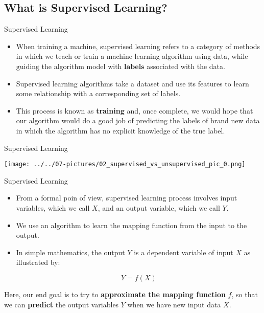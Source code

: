 \documentclass[11pt]{beamer}
\newcommand{\highlight}[1]{%
  \colorbox{yellow!100}{$\displaystyle#1$}}
\begin{document}
\subsection{What is Supervised Learning?}
\begin{frame}{Supervised Learning}
\begin{itemize}
\item When training a machine, supervised learning refers to a category of methods in which we teach or train a machine learning algorithm using data, while \highlight{\text{guiding}} the algorithm model with \highlight{\textbf{labels}} associated with the data. 
\item Supervised learning algorithms take a dataset and use its features to learn some relationship with a corresponding set of labels. 

\item This process is known as \textbf{training} and, once complete, we would hope that our algorithm would do a good job of predicting the labels of brand new data in which the algorithm has no explicit knowledge of the true label.
\end{itemize}
\end{frame}
\begin{frame}{Supervised Learning}
	\begin{center}
	\texttt{[image: ../../07-pictures/02\_supervised\_vs\_unsupervised\_pic\_0.png]}
	\end{center}
\end{frame}
\begin{frame}{Supervised Learning}
\begin{itemize}
\item From a formal poin of view, supervised learning process involves input variables, which we call $X$, and an output variable, which we call $Y$. 

\item We use an algorithm \highlight{\text{to learn the mapping function}} from the input to the output. 

\item In simple mathematics, the output $Y$ is a dependent variable of input $X$ as illustrated by:

$$Y = f(X)$$
\end{itemize}

\begin{tcolorbox}
Here, our end goal is to try to \textbf{approximate the mapping function} $f$, so that we can \textbf{predict} the output variables $Y$ when we have new input data $X$.
\end{tcolorbox}
\end{frame}
\end{document}

